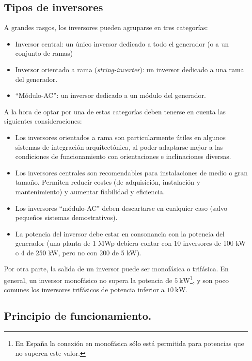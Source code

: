 \subsection{Tipos de inversores}

A grandes rasgos, los inversores pueden agruparse en tres categorías:
\begin{itemize}
\item Inversor central: un único inversor dedicado a todo el generador (o
a un conjunto de ramas)
\item Inversor orientado a rama (\emph{string-inverter}): un inversor dedicado
a una rama del generador.
\item {}``Módulo-AC'': un inversor dedicado a un módulo del generador.
\end{itemize}
A la hora de optar por una de estas categorías deben tenerse en cuenta
las siguientes consideraciones:
\begin{itemize}
\item Los inversores orientados a rama son particularmente útiles en algunos
sistemas de integración arquitectónica, al poder adaptarse mejor a
las condiciones de funcionamiento con orientaciones e inclinaciones
diversas.
\item Los inversores centrales son recomendables para instalaciones de medio
o gran tamaño. Permiten reducir costes (de adquisición, instalación
y mantenimiento) y aumentar fiabilidad y eficiencia.
\item Los inversores \textquotedblleft{}módulo-AC\textquotedblright{} deben
descartarse en cualquier caso (salvo pequeños sistemas demostrativos).
\item La potencia del inversor debe estar en consonancia con la potencia
del generador (una planta de 1 MWp debiera contar con 10 inversores
de 100 kW o 4 de 250 kW, pero no con 200 de 5 kW).
\end{itemize}

Por otra parte, la salida de un inversor puede ser monofásica o
trifásica. En general, un inversor monofásico no supera la potencia de
$\SI{5}{\kilo\watt}$\footnote{En España la conexión en monofásica sólo
está permitida para potencias que no superen este valor.}, y son poco comunes los inversores trifásicos de potencia
inferior a $\SI{10}{\kilo\watt}$.

\subsection{Principio de funcionamiento.}


